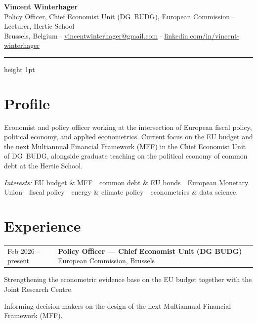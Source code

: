 \documentclass[11pt,a4paper]{article}
\makeatletter
\newcommand{\entry}[3]{%
  \noindent\begin{tabularx}{\linewidth}{@{}p{3.3cm}@{\hspace{0.5em}}X@{}}
    {\small\color{muted} #1} & {\textbf{#2}}\,\,{\small\color{muted} #3} \\
  \end{tabularx}%
}
\makeatother
\begin{document}
{\sffamily\Huge\bfseries Vincent Winterhager}\\[4pt]
{\color{muted}\normalsize Policy Officer, Chief Economist Unit (DG~BUDG), European Commission \;$\cdot$\; Lecturer, Hertie School}\\[6pt]
{\small
Brussels, Belgium \quad$\cdot$\quad
\href{mailto:vincentwinterhager@gmail.com}{vincentwinterhager@gmail.com} \quad$\cdot$\quad
\href{https://www.linkedin.com/in/vincent-winterhager-7741a8aa/}{linkedin.com/in/vincent-winterhager}
}
\vspace{4pt}
{\color{rule}\hrule height 1pt}
\vspace{2pt}

\section*{}
\vspace{-18pt}
\section{Profile}
Economist and policy officer working at the intersection of European fiscal policy, political economy, and applied econometrics. Current focus on the EU budget and the next Multiannual Financial Framework (MFF) in the Chief Economist Unit of DG~BUDG, alongside graduate teaching on the political economy of common debt at the Hertie School.

\vspace{2pt}
{\small\textit{Interests:} EU budget \& MFF \,\textbullet\, common debt \& EU bonds \,\textbullet\, European Monetary Union \,\textbullet\, fiscal policy \,\textbullet\, energy \& climate policy \,\textbullet\, econometrics \& data science.}

\section{Experience}

\entry{Feb 2026 -- present}{Policy Officer --- Chief Economist Unit (DG BUDG)}{European Commission, Brussels}
\begin{tasks}
  \item Strengthening the econometric evidence base on the EU budget together with the Joint Research Centre.
  \item Informing decision-makers on the design of the next Multiannual Financial Framework (MFF).
\end{tasks}
\end{document}
